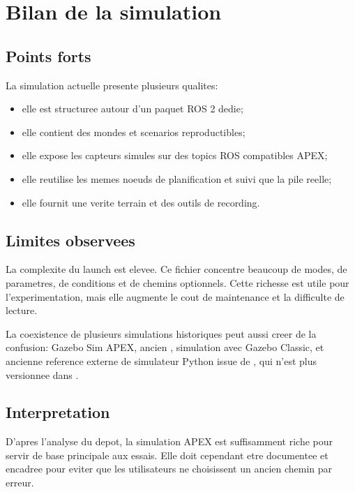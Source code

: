 \section{Bilan de la simulation}

\subsection{Points forts}

La simulation actuelle presente plusieurs qualites:

\begin{itemize}
  \item elle est structuree autour d'un paquet ROS 2 dedie;
  \item elle contient des mondes et scenarios reproductibles;
  \item elle expose les capteurs simules sur des topics ROS compatibles APEX;
  \item elle reutilise les memes noeuds de planification et suivi que la pile reelle;
  \item elle fournit une verite terrain et des outils de recording.
\end{itemize}

\subsection{Limites observees}

La complexite du launch  est elevee. Ce fichier concentre beaucoup de modes, de parametres, de conditions et de chemins optionnels. Cette richesse est utile pour l'experimentation, mais elle augmente le cout de maintenance et la difficulte de lecture.

La coexistence de plusieurs simulations historiques peut aussi creer de la confusion: Gazebo Sim APEX, ancien , simulation  avec Gazebo Classic, et ancienne reference externe de simulateur Python issue de , qui n'est plus versionnee dans .

\subsection{Interpretation}

D'apres l'analyse du depot, la simulation APEX est suffisamment riche pour servir de base principale aux essais. Elle doit cependant etre documentee et encadree pour eviter que les utilisateurs ne choisissent un ancien chemin par erreur.
